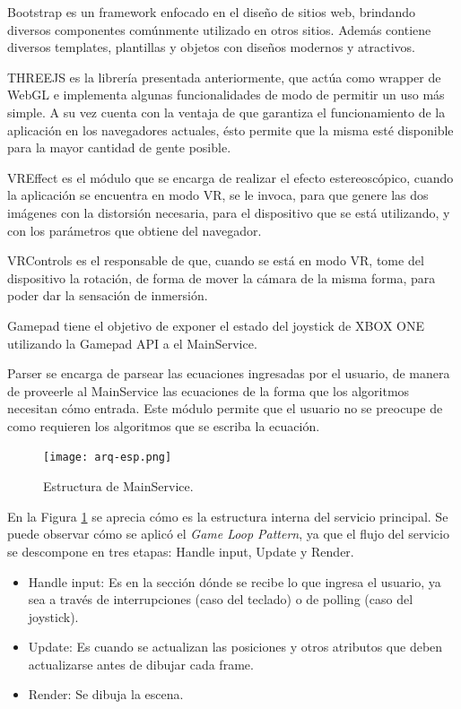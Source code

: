 \documentclass[12pt]{article}
\begin{document}
Bootstrap es un framework enfocado en el diseño de sitios web, brindando diversos componentes comúnmente utilizado en otros sitios. Además contiene diversos templates, plantillas y objetos con diseños modernos y atractivos. 

THREEJS es la librería presentada anteriormente, que actúa como wrapper de WebGL e implementa algunas funcionalidades de modo de permitir un uso más simple. A su vez cuenta con la ventaja de que garantiza el funcionamiento de la aplicación en los navegadores actuales, ésto permite que la misma esté disponible para la mayor cantidad de gente posible.

VREffect es el módulo que se encarga de realizar el efecto estereoscópico, cuando la aplicación se encuentra en modo VR, se le invoca, para que genere las dos imágenes con la distorsión necesaria, para el dispositivo que se está utilizando, y con los parámetros que obtiene del navegador.

VRControls es el responsable de que, cuando se está en modo VR, tome del dispositivo la rotación, de forma de mover la cámara de la misma forma, para poder dar la sensación de inmersión.

Gamepad tiene el objetivo de exponer el estado del joystick de XBOX ONE utilizando la Gamepad API\cite{gamepadapi} a el MainService.

Parser se encarga de parsear las ecuaciones ingresadas por el usuario, de manera de proveerle al MainService las ecuaciones de la forma que los algoritmos necesitan cómo entrada. Este módulo permite que el usuario no se preocupe de como requieren los algoritmos que se escriba la ecuación.
\clearpage
\begin{figure}[h]
\texttt{[image: arq-esp.png]}
\caption{Estructura de MainService.}
\label{arqMS}
\end{figure}
En la Figura \ref{arqMS} se aprecia cómo es la estructura interna del servicio principal. Se puede observar cómo se aplicó el \textit{Game Loop Pattern}, ya que el flujo del servicio se descompone en tres etapas: Handle input, Update y Render.
\begin{itemize}
\item Handle input: Es en la sección dónde se recibe lo que ingresa el usuario, ya sea a través de interrupciones (caso del teclado) o de polling (caso del joystick).
\item Update: Es cuando se actualizan las posiciones y otros atributos que deben actualizarse antes de dibujar cada frame.
\item Render: Se dibuja la escena.
\end{itemize}
\end{document}
